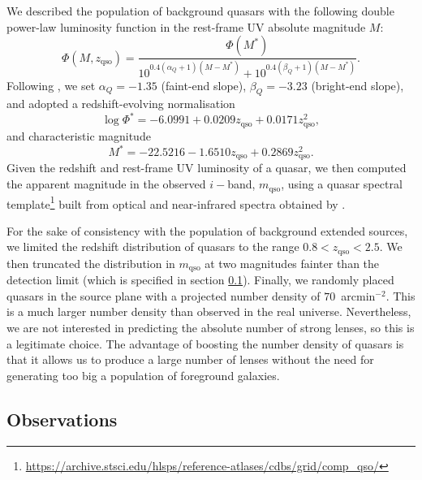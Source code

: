 \documentclass{aa}
\def\zqso{z_{\mathrm{qso}}}
\def\mqso{m_{\mathrm{qso}}}
\begin{document}
We described the population of background quasars with the following double power-law luminosity function in the rest-frame UV absolute magnitude $M$:
\begin{equation}
\Phi(M,\zqso) = \dfrac{\Phi(M^*)}{10^{0.4(\alpha_Q+1)(M - M^*)} + 10^{0.4(\beta_Q+1)(M - M^*)}}.
\end{equation}
Following \citet{Man++17}, we set $\alpha_Q=-1.35$ (faint-end slope), $\beta_Q=-3.23$ (bright-end slope), and adopted a redshift-evolving normalisation
\begin{equation}
\log{\Phi^*} = -6.0991 + 0.0209\zqso + 0.0171\zqso^2,
\end{equation}
and characteristic magnitude
\begin{equation}
M^* = -22.5216 - 1.6510\zqso + 0.2869\zqso^2.
\end{equation}
Given the redshift and rest-frame UV luminosity of a quasar, we then computed the apparent magnitude in the observed $i-$band, $\mqso$, using a quasar spectral template\footnote{\url{https://archive.stsci.edu/hlsps/reference-atlases/cdbs/grid/comp_qso/}} built from optical and near-infrared spectra obtained by \citet{vdB++01,Gli++06}.

For the sake of consistency with the population of background extended sources, we limited the redshift distribution of quasars to the range $0.8 < \zqso < 2.5$.
We then truncated the distribution in $\mqso$ at two magnitudes fainter than the detection limit (which is specified in section \ref{ssec:obs}).
Finally, we randomly placed quasars in the source plane with a projected number density of $70$~arcmin$^{-2}$. This is a much larger number density than observed in the real universe. Nevertheless, we are not interested in predicting the absolute number of strong lenses, so this is a legitimate choice. The advantage of boosting the number density of quasars is that it allows us to produce a large number of lenses without the need for generating too big a population of foreground galaxies.


\subsection{Observations}\label{ssec:obs}
\end{document}

